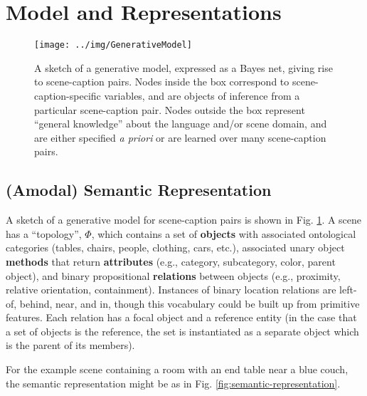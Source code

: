 \documentclass[12pt]{article}
\begin{document}
\begin{itemize}
\end{itemize}

\section{Model and Representations}
\label{sec:model-overview}

\begin{figure}[t]
  \centering
  \texttt{[image: ../img/GenerativeModel]}
  \caption{A sketch of a generative model, expressed as a Bayes net, giving rise to scene-caption pairs.  Nodes inside the box correspond to scene-caption-specific variables, and are objects of inference from a particular scene-caption pair.  Nodes outside the box represent ``general knowledge'' about the language and/or scene domain, and are either specified {\it a priori} or are learned over many scene-caption pairs.}
  \label{fig:generative-model}
\end{figure}

\subsection{(Amodal) Semantic Representation}
\label{sec:sem-repr}

A sketch of a generative model for scene-caption pairs is shown in Fig. \ref{fig:generative-model}.  A scene has a ``topology'', $\Phi$, which contains a set of {\bf objects} with associated ontological categories (tables, chairs, people, clothing, cars, etc.), associated unary object {\bf methods} that return {\bf attributes} (e.g., category, subcategory, color, parent object), and binary propositional {\bf relations} between objects (e.g., proximity, relative orientation, containment).  Instances of binary location relations are {\sc left-of}, {\sc behind}, {\sc near}, and {\sc in}, though this vocabulary could be built up from primitive features.  Each relation has a focal object and a reference entity (in the case that a set of objects is the reference, the set is instantiated as a separate object which is the parent of its members).

For the example scene containing a room with an end table near a blue couch, the semantic representation might be as in Fig. \ref{fig:semantic-representation}.
\end{document}
